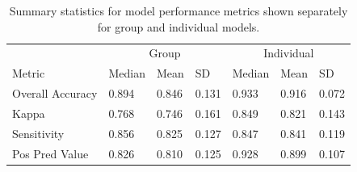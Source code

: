 \documentclass[
  man]{apa6}
\begin{document}
\begin{table}[tbp]

\begin{center}
\begin{threeparttable}

\caption{\label{tab:metrics-table}Summary statistics for model performance metrics shown separately for group and individual models.}

\begin{tabular}{lllllll}
\toprule
 & \multicolumn{3}{c}{Group} & \multicolumn{3}{c}{Individual} \\
\cmidrule(r){2-4} \cmidrule(r){5-7}
Metric & Median & Mean & SD & Median & Mean & SD\\
\midrule
Overall Accuracy & 0.894 & 0.846 & 0.131 & 0.933 & 0.916 & 0.072\\
Kappa & 0.768 & 0.746 & 0.161 & 0.849 & 0.821 & 0.143\\
Sensitivity & 0.856 & 0.825 & 0.127 & 0.847 & 0.841 & 0.119\\
Pos Pred Value & 0.826 & 0.810 & 0.125 & 0.928 & 0.899 & 0.107\\
\bottomrule
\end{tabular}

\end{threeparttable}
\end{center}

\end{table}

\renewcommand{\arraystretch}{.75}
\end{document}
